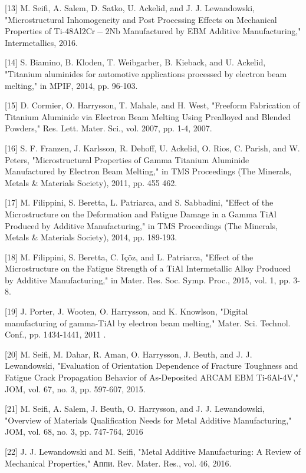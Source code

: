 \documentclass[10pt]{article}
\begin{document}
[13] M. Seifi, A. Salem, D. Satko, U. Ackelid, and J. J. Lewandowski, "Microstructural Inhomogeneity and Post Processing Effects on Mechanical Properties of Ti-48Al$2 \mathrm{Cr}-2 \mathrm{Nb}$ Manufactured by EBM Additive Manufacturing," Intermetallics, 2016.

[14] S. Biamino, B. Kloden, T. Weibgarber, B. Kieback, and U. Ackelid, "Titanium aluminides for automotive applications processed by electron beam melting," in MPIF, 2014, pp. 96-103.

[15] D. Cormier, O. Harrysson, T. Mahale, and H. West, "Freeform Fabrication of Titanium Aluminide via Electron Beam Melting Using Prealloyed and Blended Powders," Res. Lett. Mater. Sci., vol. 2007, pp. 1-4, 2007.

[16] S. F. Franzen, J. Karlsson, R. Dehoff, U. Ackelid, O. Rios, C. Parish, and W. Peters, "Microstructural Properties of Gamma Titanium Aluminide Manufactured by Electron Beam Melting," in TMS Proceedings (The Minerals, Metals \& Materials Society), 2011, pp. 455 462.

[17] M. Filippini, S. Beretta, L. Patriarca, and S. Sabbadini, "Effect of the Microstructure on the Deformation and Fatigue Damage in a Gamma TiAl Produced by Additive Manufacturing," in TMS Proceedings (The Minerals, Metals \& Materials Society), 2014, pp. 189-193.

[18] M. Filippini, S. Beretta, C. Içöz, and L. Patriarca, "Effect of the Microstructure on the Fatigue Strength of a TiAl Intermetallic Alloy Produced by Additive Manufacturing," in Mater. Res. Soc. Symp. Proc., 2015, vol. 1, pp. 3-8.

[19] J. Porter, J. Wooten, O. Harrysson, and K. Knowlson, "Digital manufacturing of gamma-TiAl by electron beam melting," Mater. Sci. Technol. Conf., pp. 1434-1441, 2011 .

[20] M. Seifi, M. Dahar, R. Aman, O. Harrysson, J. Beuth, and J. J. Lewandowski, "Evaluation of Orientation Dependence of Fracture Toughness and Fatigue Crack Propagation Behavior of As-Deposited ARCAM EBM Ti-6Al-4V," JOM, vol. 67, no. 3, pp. 597-607, 2015.

[21] M. Seifi, A. Salem, J. Beuth, O. Harrysson, and J. J. Lewandowski, "Overview of Materials Qualification Needs for Metal Additive Manufacturing," JOM, vol. 68, no. 3, pp. 747-764, 2016

[22] J. J. Lewandowski and M. Seifi, "Metal Additive Manufacturing: A Review of Mechanical Properties," Аппи. Rev. Mater. Res., vol. 46, 2016.
\end{document}
